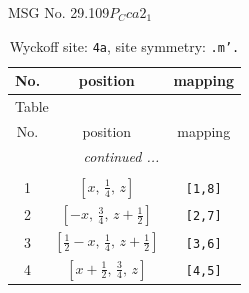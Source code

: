 \documentclass[fleqn,8pt]{jsarticle}
\begin{document}
\setcounter{MaxMatrixCols}{32}

\renewcommand{\tablename}{Table~}
\renewcommand{\figurename}{Figure~}
\begin{center}
\LARGE
MSG No. 29.109\quad$P_{C}ca2_{1}$
\end{center}
\renewcommand{\arraystretch}{1.2}
\begin{longtable}{ccc}
\caption{Wyckoff site: {\tt 4a}, site symmetry: {\tt .m'.}}
 \\
 \hline \hline
No. & position & mapping \\ \hline \endfirsthead

\multicolumn{2}{l}{\tablename\ \thetable{}} \\
 \hline \hline
No. & position & mapping \\ \hline \endhead

 \hline \hline
\multicolumn{2}{r}{\footnotesize\it continued ...} \\ \endfoot

 \hline \hline
\multicolumn{2}{r}{} \\ \endlastfoot

1 & $\left[ x,\, \frac{1}{4},\, z \right]$ & {\tt [1,8]} \\ \hline
2 & $\left[ - x,\, \frac{3}{4},\, z + \frac{1}{2} \right]$ & {\tt [2,7]} \\ \hline
3 & $\left[ \frac{1}{2} - x,\, \frac{1}{4},\, z + \frac{1}{2} \right]$ & {\tt [3,6]} \\ \hline
4 & $\left[ x + \frac{1}{2},\, \frac{3}{4},\, z \right]$ & {\tt [4,5]} \\
\end{longtable}
\renewcommand{\arraystretch}{1.2}
\end{document}
